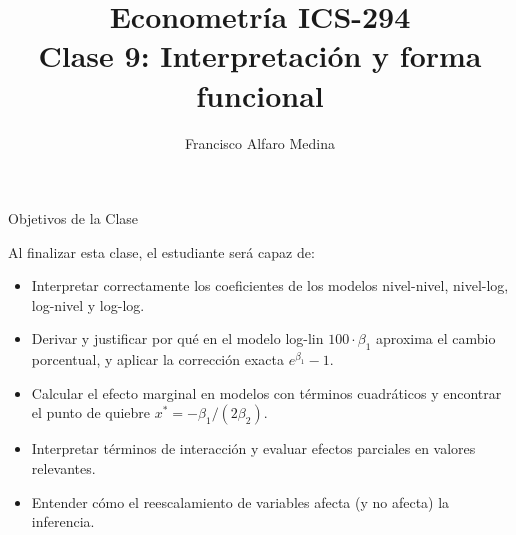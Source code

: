 \documentclass{beamer}
\title[ICS-294]{Econometría ICS-294\\ \small{Clase 9: Interpretaci\'on y forma funcional}}
\author{Francisco Alfaro Medina}
\institute[USM]
{Universidad Técnica Federico Santa María\\ %
	\medskip
	\textit{francisco.alfaro@usm.cl} %

}
\date{}
\begin{document}
\begin{frame}
	\titlepage %


\end{frame}
\logo{}

\begin{frame}{Objetivos de la Clase}

Al finalizar esta clase, el estudiante será capaz de:

\begin{itemize}
    \item[\checkmark] Interpretar correctamente los coeficientes de los modelos nivel-nivel, nivel-log, log-nivel y log-log.
    \item[\checkmark] Derivar y justificar por qué en el modelo log-lin $100\cdot\beta_1$ aproxima el cambio porcentual, y aplicar la corrección exacta $e^{\beta_1}-1$.
    \item[\checkmark] Calcular el efecto marginal en modelos con términos cuadráticos y encontrar el punto de quiebre $x^*=-\beta_1/(2\beta_2)$.
    \item[\checkmark] Interpretar términos de interacción y evaluar efectos parciales en valores relevantes.
    \item[\checkmark] Entender cómo el reescalamiento de variables afecta (y no afecta) la inferencia.
\end{itemize}

\end{frame}
\end{document}
